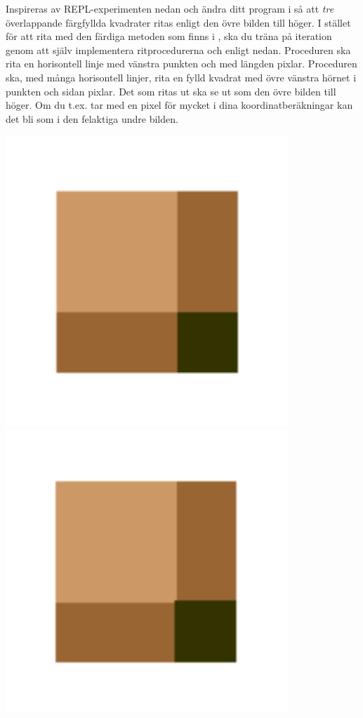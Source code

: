 \noindent\begin{minipage}{0.82\textwidth}
\Subtask Inspireras av REPL-experimenten nedan och ändra ditt program i  så att \emph{tre} överlappande färgfyllda kvadrater ritas enligt den övre bilden till höger. I stället för att rita med den färdiga metoden  som finns i , ska du träna på iteration genom att själv implementera ritprocedurerna  och  enligt nedan.
  Proceduren  ska rita en horisontell linje med vänstra punkten  och med längden  pixlar. Proceduren  ska, med många horisontell linjer, rita en fylld kvadrat med övre vänstra hörnet i punkten  och sidan  pixlar. Det som ritas ut ska se ut som den övre bilden till höger. Om du t.ex. tar med en pixel för mycket i dina koordinatberäkningar kan det bli som i den felaktiga undre bilden.
\end{minipage}
\hfill\begin{minipage}{0.23\textwidth}
\includegraphics[width=0.8\textwidth]{../img/fyll-rak.png}
\includegraphics[width=0.8\textwidth]{../img/fyll-rak-fel.png}

\end{minipage}

